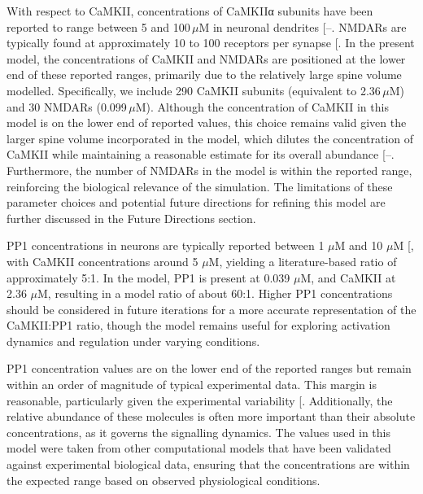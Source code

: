 \documentclass[
  11pt,
  letterpaper,
]{scrreprt}
\begin{document}
With respect to CaMKII, concentrations of CaMKIIα subunits have been
reported to range between 5 and 100\,\(\mu\text{M}\) in neuronal
dendrites
{[}--\citeproc{ref-otmakhov2012Measuring}{444}{]}.
NMDARs are typically found at approximately 10 to 100 receptors per
synapse {[}\citeproc{ref-petralia2012Distribution}{445}{]}. In the
present model, the concentrations of CaMKII and NMDARs are positioned at
the lower end of these reported ranges, primarily due to the relatively
large spine volume modelled. Specifically, we include 290 CaMKII
subunits (equivalent to 2.36\,\(\mu\text{M}\)) and 30 NMDARs
(0.099\,\(\mu\text{M}\)). Although the concentration of CaMKII in this
model is on the lower end of reported values, this choice remains valid
given the larger spine volume incorporated in the model, which dilutes
the concentration of CaMKII while maintaining a reasonable estimate for
its overall abundance
{[}--\citeproc{ref-otmakhov2012Measuring}{444}{]}.
Furthermore, the number of NMDARs in the model is within the reported
range, reinforcing the biological relevance of the simulation. The
limitations of these parameter choices and potential future directions
for refining this model are further discussed in the Future Directions
section.

PP1 concentrations in neurons are typically reported between 1
\(\mu\text{M}\) and 10 \(\mu\text{M}\)
{[}\citeproc{ref-cohen2002Protein}{446}{]}, with CaMKII concentrations
around 5 \(\mu\text{M}\), yielding a literature-based ratio of
approximately 5:1. In the model, PP1 is present at 0.039
\(\mu\text{M}\), and CaMKII at 2.36 \(\mu\text{M}\), resulting in a
model ratio of about 60:1. Higher PP1 concentrations should be
considered in future iterations for a more accurate representation of
the CaMKII:PP1 ratio, though the model remains useful for exploring
activation dynamics and regulation under varying conditions.

PP1 concentration values are on the lower end of the reported ranges but
remain within an order of magnitude of typical experimental data. This
margin is reasonable, particularly given the experimental variability
{[}\citeproc{ref-eastwood2006Minimum}{447}{]}. Additionally, the
relative abundance of these molecules is often more important than their
absolute concentrations, as it governs the signalling dynamics. The
values used in this model were taken from other computational models
that have been validated against experimental biological data, ensuring
that the concentrations are within the expected range based on observed
physiological conditions.
\end{document}
